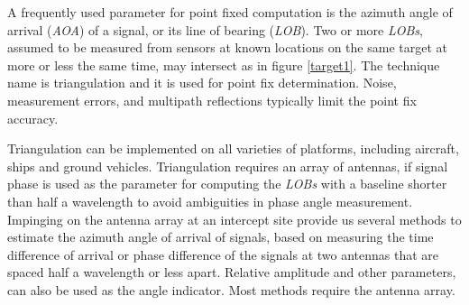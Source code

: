 \documentclass[english,purist]{ist-report}
\begin{document}
A frequently used parameter for point fixed computation is the azimuth angle of arrival (\textit{AOA}) of a signal, or its line of bearing (\textit{LOB}). Two or more \textit{LOBs}, assumed to be measured from sensors at known locations on the same target at more or less the same time, may intersect as in figure \ref{target1}. The technique name is triangulation and it is used for point fix determination. 
Noise, measurement errors, and multipath reflections typically limit the point fix accuracy. 

Triangulation can be implemented on all varieties of platforms, including aircraft, ships and ground vehicles. Triangulation requires an array of antennas, if signal phase is used as the parameter for computing the \textit{LOBs} with a baseline shorter than half a wavelength to avoid ambiguities in phase angle measurement.
Impinging on the antenna array at an intercept site provide us several methods to estimate the azimuth angle of arrival of signals, based on measuring the time difference of arrival or phase difference of the signals at two antennas that are spaced half a wavelength or less apart. Relative amplitude and other parameters, can also be used as the angle indicator. Most methods require the antenna array. 
\end{document}

